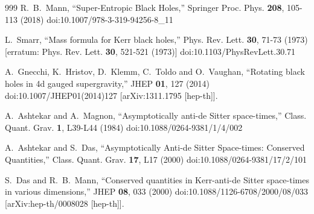 \documentclass[aps,preprint]{revtex4}%
\begin{document}
\begin{thebibliography}{999}
R.~B.~Mann,
``Super-Entropic Black Holes,''
Springer Proc. Phys. \textbf{208}, 105-113 (2018)
doi:10.1007/978-3-319-94256-8\_11






L.~Smarr,
``Mass formula for Kerr black holes,''
Phys. Rev. Lett. \textbf{30}, 71-73 (1973)
[erratum: Phys. Rev. Lett. \textbf{30}, 521-521 (1973)]
doi:10.1103/PhysRevLett.30.71

A.~Gnecchi, K.~Hristov, D.~Klemm, C.~Toldo and O.~Vaughan,
``Rotating black holes in 4d gauged supergravity,''
JHEP \textbf{01}, 127 (2014)
doi:10.1007/JHEP01(2014)127
[arXiv:1311.1795 [hep-th]].

A.~Ashtekar and A.~Magnon,
``Asymptotically anti-de Sitter space-times,''
Class. Quant. Grav. \textbf{1}, L39-L44 (1984)
doi:10.1088/0264-9381/1/4/002

A.~Ashtekar and S.~Das,
``Asymptotically Anti-de Sitter Space-times: Conserved Quantities,''
Class. Quant. Grav. \textbf{17}, L17 (2000)
doi:10.1088/0264-9381/17/2/101

S.~Das and R.~B.~Mann,
``Conserved quantities in Kerr-anti-de Sitter space-times in various dimensions,''
JHEP \textbf{08}, 033 (2000)
doi:10.1088/1126-6708/2000/08/033
[arXiv:hep-th/0008028 [hep-th]].



\end{thebibliography}
\end{document}
